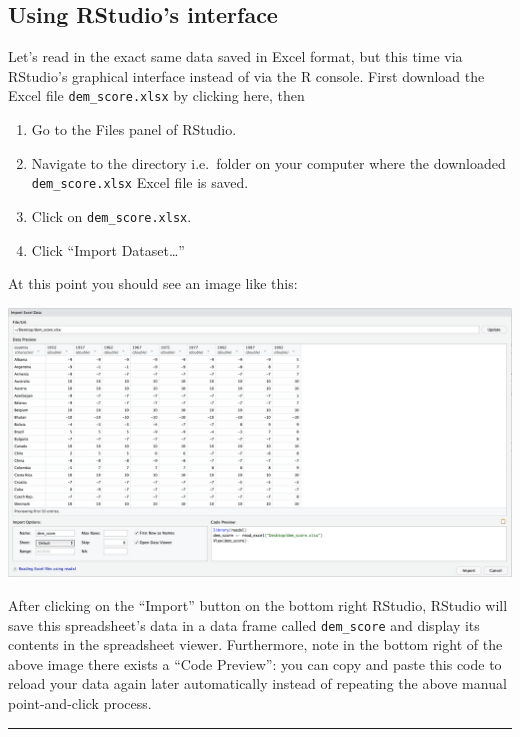 \documentclass[12pt, krantz2,]{krantz}
\providecommand{\tightlist}{%
  \setlength{\itemsep}{0pt}\setlength{\parskip}{0pt}}
\begin{document}
\hypertarget{using-rstudios-interface}{%
\subsection{Using RStudio's interface}\label{using-rstudios-interface}}

Let's read in the exact same data saved in Excel format, but this time via RStudio's graphical interface instead of via the R console. First download the Excel file \texttt{dem\_score.xlsx} by clicking here, then

\begin{enumerate}
\def\labelenumi{\arabic{enumi}.}
\tightlist
\item
  Go to the Files panel of RStudio.
\item
  Navigate to the directory i.e.~folder on your computer where the downloaded \texttt{dem\_score.xlsx} Excel file is saved.
\item
  Click on \texttt{dem\_score.xlsx}.
\item
  Click ``Import Dataset\ldots{}''
\end{enumerate}

At this point you should see an image like this:

\includegraphics{images/read_excel.png}

After clicking on the ``Import'' button on the bottom right RStudio, RStudio will save this spreadsheet's data in a data frame called \texttt{dem\_score} and display its contents in the spreadsheet viewer. Furthermore, note in the bottom right of the above image there exists a ``Code Preview'': you can copy and paste this code to reload your data again later automatically instead of repeating the above manual point-and-click process.

\begin{center}\rule{0.5\linewidth}{\linethickness}\end{center}
\end{document}
